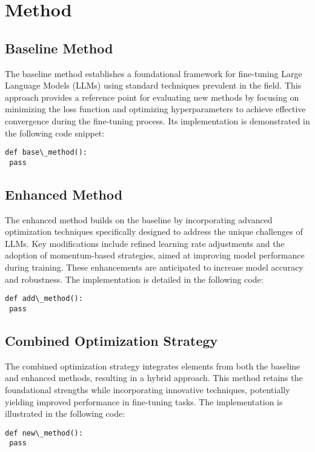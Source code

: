 \documentclass{article} %
\begin{document}
\section{Method}
\label{sec:method}
\subsection{Baseline Method} \label{sec:baseline\_method}
The baseline method establishes a foundational framework for fine-tuning Large Language Models (LLMs) using standard techniques prevalent in the field. This approach provides a reference point for evaluating new methods by focusing on minimizing the loss function and optimizing hyperparameters to achieve effective convergence during the fine-tuning process. Its implementation is demonstrated in the following code snippet:
\begin{verbatim}
def base\_method():
 pass
\end{verbatim}

\subsection{Enhanced Method} \label{sec:enhanced\_method}
The enhanced method builds on the baseline by incorporating advanced optimization techniques specifically designed to address the unique challenges of LLMs. Key modifications include refined learning rate adjustments and the adoption of momentum-based strategies, aimed at improving model performance during training. These enhancements are anticipated to increase model accuracy and robustness. The implementation is detailed in the following code:
\begin{verbatim}
def add\_method():
 pass
\end{verbatim}

\subsection{Combined Optimization Strategy} \label{sec:combined\_optimization\_strategy}
The combined optimization strategy integrates elements from both the baseline and enhanced methods, resulting in a hybrid approach. This method retains the foundational strengths while incorporating innovative techniques, potentially yielding improved performance in fine-tuning tasks. The implementation is illustrated in the following code:
\begin{verbatim}
def new\_method():
 pass
\end{verbatim}
\end{document}
